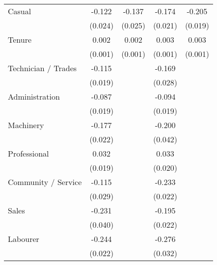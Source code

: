 {\begin{tabular}{l*{4}{c}}
Casual              &      -0.122\sym{***}&      -0.137\sym{***}&      -0.174\sym{***}&      -0.205\sym{***}\\
                    &     (0.024)         &     (0.025)         &     (0.021)         &     (0.019)         \\
Tenure              &       0.002\sym{**} &       0.002\sym{**} &       0.003\sym{***}&       0.003\sym{***}\\
                    &     (0.001)         &     (0.001)         &     (0.001)         &     (0.001)         \\
Technician / Trades &      -0.115\sym{***}&                     &      -0.169\sym{***}&                     \\
                    &     (0.019)         &                     &     (0.028)         &                     \\
Administration      &      -0.087\sym{***}&                     &      -0.094\sym{***}&                     \\
                    &     (0.019)         &                     &     (0.019)         &                     \\
Machinery           &      -0.177\sym{***}&                     &      -0.200\sym{***}&                     \\
                    &     (0.022)         &                     &     (0.042)         &                     \\
Professional        &       0.032\sym{*}  &                     &       0.033         &                     \\
                    &     (0.019)         &                     &     (0.020)         &                     \\
Community / Service &      -0.115\sym{***}&                     &      -0.233\sym{***}&                     \\
                    &     (0.029)         &                     &     (0.022)         &                     \\
Sales               &      -0.231\sym{***}&                     &      -0.195\sym{***}&                     \\
                    &     (0.040)         &                     &     (0.022)         &                     \\
Labourer            &      -0.244\sym{***}&                     &      -0.276\sym{***}&                     \\
                    &     (0.022)         &                     &     (0.032)         &                     \\

\end{tabular}}
